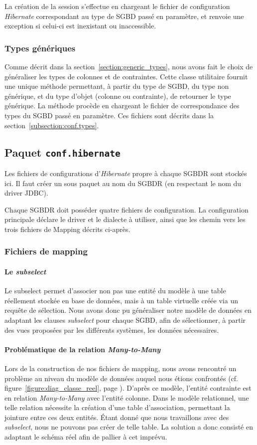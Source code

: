 La création de la session s'effectue en chargeant le fichier de configuration \emph{Hibernate} correspondant au type de SGBD passé en paramètre, et renvoie une exception si celui-ci est inexistant ou inaccessible.

\subsubsection{Types génériques}
Comme décrit dans la section~\ref{section:generic_types}, nous avons fait le choix de généraliser les types de colonnes et de contraintes. Cette classe utilitaire fournit une unique méthode permettant, à partir du type de SGBD, du type non générique, et du type d'objet (colonne ou contrainte), de retourner le type générique. La méthode procède en chargeant le fichier de correspondance des types du SGBD passé en paramètre. Ces fichiers sont décrits dans la section~\ref{subsection:conf.types}.

\subsection{Paquet \texttt{conf.hibernate}}
Les fichiers de configurations d'\emph{Hibernate} propre à chaque SGBDR sont stockés ici. Il faut créer un sous paquet au nom du SGBDR (en respectant le nom du driver JDBC).

Chaque SGBDR doit posséder quatre fichiers de configuration. La configuration principale déclare le driver et le dialecte à utiliser, ainsi que les chemin vers les trois fichiers de Mapping décrits ci-après.
\subsubsection{Fichiers de mapping}
\paragraph{Le \emph{subselect}} Le subselect permet d'associer non pas une entité du modèle à une table réellement stockée en  base de données, mais à un table virtuelle créée via un requête de sélection. Nous avons donc pu généraliser notre modèle de données en adaptant les clauses \emph{subselect} pour chaque SGBD, afin de sélectionner, à partir des vues proposées par les différents systèmes, les données nécessaires.

\paragraph{Problématique de la relation \emph{Many-to-Many}}
Lors de la construction de nos fichiers de mapping, nous avons rencontré un problème au niveau du modèle de données auquel nous étions confrontés (cf. figure~\ref{figure:diag_classe_reel}, page \pageref{figure:diag_classe_reel}). D'après ce modèle, l'entité contrainte est en relation \emph{Many-to-Many} avec l'entité colonne. Dans le modèle relationnel, une telle relation nécessite la création d'une table d'association, permettant la jointure entre ces deux entités. Étant donné que nous travaillons avec des \emph{subselect}, nous ne pouvons pas créer de telle table. La solution a donc consisté en adaptant le schéma réel afin de pallier à cet imprévu.

